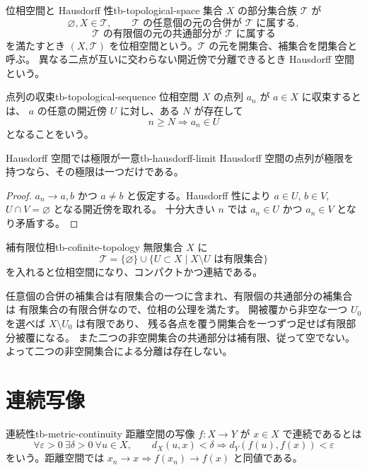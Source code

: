 \begin{definition}{位相空間と Hausdorff 性}{tb-topological-space}
集合 $X$ の部分集合族 $\mathcal T$ が
\[
\varnothing,X\in\mathcal T,\qquad
\mathcal T\text{ の任意個の元の合併が }\mathcal T\text{ に属する},
\]
\[
\mathcal T\text{ の有限個の元の共通部分が }\mathcal T\text{ に属する}
\]
を満たすとき $(X,\mathcal T)$ を位相空間という。$\mathcal T$ の元を開集合、補集合を閉集合と呼ぶ。
異なる二点が互いに交わらない開近傍で分離できるとき Hausdorff 空間という。
\end{definition}

\begin{definition}{点列の収束}{tb-topological-sequence}
位相空間 $X$ の点列 $a_n$ が $a\in X$ に収束するとは、
$a$ の任意の開近傍 $U$ に対し、ある $N$ が存在して
\[
n\ge N\Longrightarrow a_n\in U
\]
となることをいう。
\end{definition}

\begin{proposition}{Hausdorff 空間では極限が一意}{tb-hausdorff-limit}
Hausdorff 空間の点列が極限を持つなら、その極限は一つだけである。
\end{proposition}

\begin{proof}
$a_n\to a,b$ かつ $a\ne b$ と仮定する。Hausdorff 性により
$a\in U$, $b\in V$, $U\cap V=\varnothing$ となる開近傍を取れる。
十分大きい $n$ では $a_n\in U$ かつ $a_n\in V$ となり矛盾する。
\end{proof}

\begin{proposition}{補有限位相}{tb-cofinite-topology}
無限集合 $X$ に
\[
\mathcal T=\{\varnothing\}\cup
\{U\subset X\mid X\setminus U\text{ は有限集合}\}
\]
を入れると位相空間になり、コンパクトかつ連結である。
\end{proposition}

任意個の合併の補集合は有限集合の一つに含まれ、有限個の共通部分の補集合は
有限集合の有限合併なので、位相の公理を満たす。
開被覆から非空な一つ $U_0$ を選べば $X\setminus U_0$ は有限であり、
残る各点を覆う開集合を一つずつ足せば有限部分被覆になる。
また二つの非空開集合の共通部分は補有限、従って空でない。
よって二つの非空開集合による分離は存在しない。

\section{連続写像}

\begin{definition}{連続性}{tb-metric-continuity}
距離空間の写像 $f:X\to Y$ が $x\in X$ で連続であるとは
\[
\forall\varepsilon>0\ \exists\delta>0\ \forall u\in X,\qquad
d_X(u,x)<\delta\Rightarrow d_Y(f(u),f(x))<\varepsilon
\]
をいう。距離空間では $x_n\to x\Rightarrow f(x_n)\to f(x)$ と同値である。
\end{definition}

